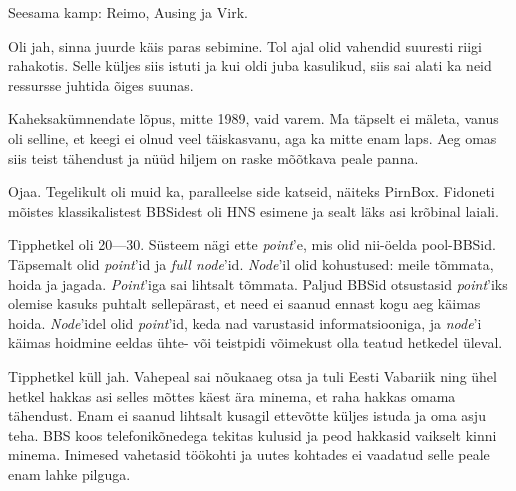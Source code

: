 Seesama kamp: Reimo, Ausing 
 ja Virk.
 

Oli jah, sinna juurde käis paras sebimine. Tol ajal olid vahendid suuresti riigi rahakotis. Selle küljes siis 
istuti ja kui oldi juba kasulikud, siis sai alati ka neid ressursse juhtida õiges suunas. 


Kaheksakümnendate lõpus, mitte 1989, vaid varem. Ma täpselt ei mäleta, 
vanus oli selline, et keegi ei olnud veel täiskasvanu, aga ka mitte enam laps. Aeg omas siis teist tähendust ja nüüd hiljem on
raske mõõtkava peale panna.


Ojaa. Tegelikult oli muid ka, paralleelse side katseid, näiteks 
PirnBox. Fidoneti mõistes klassikalistest BBSidest oli HNS esimene ja sealt läks 
asi krõbinal laiali.


Tipphetkel oli 20---30. Süsteem nägi ette \emph{point}'e, mis olid nii-öelda pool-BBSid. Täpsemalt olid \emph{point}'id ja \emph{full 
node}'id. \emph{Node}'il olid kohustused: meile tõmmata, hoida ja 
jagada. \emph{Point}'iga sai lihtsalt tõmmata. Paljud 
BBSid otsustasid \emph{point}'iks olemise kasuks puhtalt sellepärast, et need 
ei saanud ennast kogu aeg käimas hoida. \emph{Node}'idel olid \emph{point}'id, keda nad varustasid 
informatsiooniga, ja \emph{node}'i käimas hoidmine eeldas ühte- või teistpidi 
võimekust olla teatud hetkedel üleval.


Tipphetkel küll jah. Vahepeal sai nõukaaeg otsa ja tuli Eesti Vabariik ning ühel 
hetkel hakkas asi selles mõttes käest ära minema, et raha hakkas omama 
tähendust. Enam ei saanud lihtsalt kusagil ettevõtte küljes istuda ja oma
asju teha. BBS koos telefonikõnedega tekitas kulusid ja peod
hakkasid vaikselt kinni minema. Inimesed vahetasid töökohti ja uutes 
kohtades ei vaadatud selle peale enam lahke pilguga.

